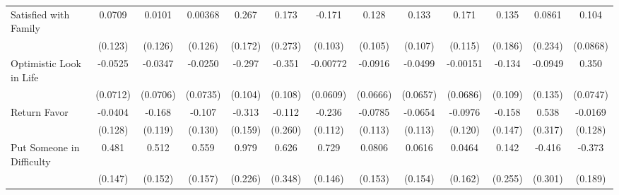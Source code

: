{\begin{tabular}{l*{12}{c}}
\addlinespace
Satisfied with Family&      0.0709         &      0.0101         &     0.00368         &       0.267         &       0.173         &      -0.171         &       0.128         &       0.133         &       0.171         &       0.135         &      0.0861         &       0.104         \\
            &     (0.123)         &     (0.126)         &     (0.126)         &     (0.172)         &     (0.273)         &     (0.103)         &     (0.105)         &     (0.107)         &     (0.115)         &     (0.186)         &     (0.234)         &    (0.0868)         \\
\addlinespace
Optimistic Look in Life&     -0.0525         &     -0.0347         &     -0.0250         &      -0.297\sym{**} &      -0.351\sym{**} &    -0.00772         &     -0.0916         &     -0.0499         &    -0.00151         &      -0.134         &     -0.0949         &       0.350\sym{***}\\
            &    (0.0712)         &    (0.0706)         &    (0.0735)         &     (0.104)         &     (0.108)         &    (0.0609)         &    (0.0666)         &    (0.0657)         &    (0.0686)         &     (0.109)         &     (0.135)         &    (0.0747)         \\
\addlinespace
Return Favor&     -0.0404         &      -0.168         &      -0.107         &      -0.313\sym{*}  &      -0.112         &      -0.236\sym{*}  &     -0.0785         &     -0.0654         &     -0.0976         &      -0.158         &       0.538         &     -0.0169         \\
            &     (0.128)         &     (0.119)         &     (0.130)         &     (0.159)         &     (0.260)         &     (0.112)         &     (0.113)         &     (0.113)         &     (0.120)         &     (0.147)         &     (0.317)         &     (0.128)         \\
\addlinespace
Put Someone in Difficulty&       0.481\sym{**} &       0.512\sym{***}&       0.559\sym{***}&       0.979\sym{***}&       0.626         &       0.729\sym{***}&      0.0806         &      0.0616         &      0.0464         &       0.142         &      -0.416         &      -0.373\sym{*}  \\
            &     (0.147)         &     (0.152)         &     (0.157)         &     (0.226)         &     (0.348)         &     (0.146)         &     (0.153)         &     (0.154)         &     (0.162)         &     (0.255)         &     (0.301)         &     (0.189)         \\

\end{tabular}}
